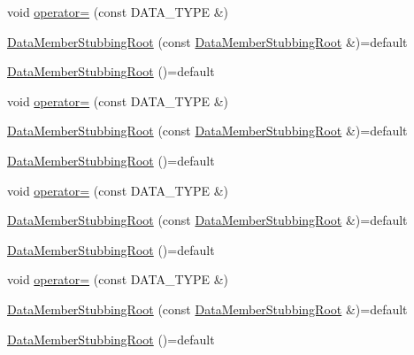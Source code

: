 \begin{DoxyCompactItemize}
\item 
void \mbox{\hyperlink{classfakeit_1_1DataMemberStubbingRoot_a9658c86eff24d9703cda9318c0c59001}{operator=}} (const D\+A\+T\+A\+\_\+\+T\+Y\+PE \&)
\item 
\mbox{\hyperlink{classfakeit_1_1DataMemberStubbingRoot_a55cf882f6905323f1d5f227bafce29a3}{Data\+Member\+Stubbing\+Root}} (const \mbox{\hyperlink{classfakeit_1_1DataMemberStubbingRoot}{Data\+Member\+Stubbing\+Root}} \&)=default
\item 
\mbox{\hyperlink{classfakeit_1_1DataMemberStubbingRoot_aa412dfee88ec661b0db74915cbfc96ca}{Data\+Member\+Stubbing\+Root}} ()=default
\item 
void \mbox{\hyperlink{classfakeit_1_1DataMemberStubbingRoot_a9658c86eff24d9703cda9318c0c59001}{operator=}} (const D\+A\+T\+A\+\_\+\+T\+Y\+PE \&)
\item 
\mbox{\hyperlink{classfakeit_1_1DataMemberStubbingRoot_a55cf882f6905323f1d5f227bafce29a3}{Data\+Member\+Stubbing\+Root}} (const \mbox{\hyperlink{classfakeit_1_1DataMemberStubbingRoot}{Data\+Member\+Stubbing\+Root}} \&)=default
\item 
\mbox{\hyperlink{classfakeit_1_1DataMemberStubbingRoot_aa412dfee88ec661b0db74915cbfc96ca}{Data\+Member\+Stubbing\+Root}} ()=default
\item 
void \mbox{\hyperlink{classfakeit_1_1DataMemberStubbingRoot_a9658c86eff24d9703cda9318c0c59001}{operator=}} (const D\+A\+T\+A\+\_\+\+T\+Y\+PE \&)
\item 
\mbox{\hyperlink{classfakeit_1_1DataMemberStubbingRoot_a55cf882f6905323f1d5f227bafce29a3}{Data\+Member\+Stubbing\+Root}} (const \mbox{\hyperlink{classfakeit_1_1DataMemberStubbingRoot}{Data\+Member\+Stubbing\+Root}} \&)=default
\item 
\mbox{\hyperlink{classfakeit_1_1DataMemberStubbingRoot_aa412dfee88ec661b0db74915cbfc96ca}{Data\+Member\+Stubbing\+Root}} ()=default
\item 
void \mbox{\hyperlink{classfakeit_1_1DataMemberStubbingRoot_a9658c86eff24d9703cda9318c0c59001}{operator=}} (const D\+A\+T\+A\+\_\+\+T\+Y\+PE \&)
\item 
\mbox{\hyperlink{classfakeit_1_1DataMemberStubbingRoot_a55cf882f6905323f1d5f227bafce29a3}{Data\+Member\+Stubbing\+Root}} (const \mbox{\hyperlink{classfakeit_1_1DataMemberStubbingRoot}{Data\+Member\+Stubbing\+Root}} \&)=default
\item 
\mbox{\hyperlink{classfakeit_1_1DataMemberStubbingRoot_aa412dfee88ec661b0db74915cbfc96ca}{Data\+Member\+Stubbing\+Root}} ()=default
\item 

\end{DoxyCompactItemize}
